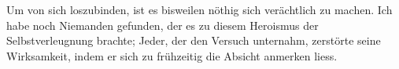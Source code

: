 Um von sich loszubinden, ist es bisweilen nöthig sich verächtlich zu machen. Ich habe noch Niemanden gefunden, der es zu diesem Heroismus der Selbstverleugnung brachte; Jeder, der den Versuch unternahm, zerstörte seine Wirksamkeit, indem er sich zu frühzeitig die Absicht anmerken liess.
\par

